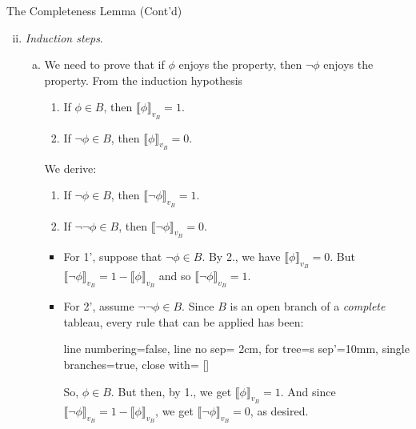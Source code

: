 \begin{frame}{The Completeness Lemma (Cont'd)}

\begin{enumerate}[(i)]
	
	\setcounter{enumi}{1}
	
	\item \emph{Induction steps}.
	
	\begin{enumerate}[(a)]
		
			\item We need to prove that if $\phi$ enjoys the property, then $\neg \phi$ enjoys the property. From the induction hypothesis
		
				\begin{enumerate}[1.]
	
					\item If $\phi\in B$, then $\llbracket\phi\rrbracket_{v_B}=1$. 
	
					\item If $\neg \phi\in B$, then $\llbracket\phi\rrbracket_{v_B}=0$.
	
				\end{enumerate}
	We derive:
		\begin{enumerate}[1'.]
	
		\item If $\neg\phi\in B$, then $\llbracket\neg\phi\rrbracket_{v_B}=1$.
			\item If $\neg\neg \phi\in B$, then $\llbracket\neg\phi\rrbracket_{v_B}=0$.	
		\end{enumerate}
		
		\begin{itemize}
	
		\item For 1', suppose that $\neg \phi\in B$. By 2., we have $\llbracket\phi\rrbracket_{v_B}=0$. But $\llbracket\neg\phi\rrbracket_{v_B}=1-\llbracket\phi\rrbracket_{v_B}$ and so $\llbracket\neg\phi\rrbracket_{v_B}=1$.
		
		\item For 2', assume $\neg\neg \phi\in B$. Since $B$ is an open branch of a \emph{complete} tableau, every rule that can be applied has been:
		\begin{center}{\small
					\begin{prooftree}
					{
					line numbering=false,
					line no sep= 2cm,
					for tree={s sep'=10mm},
					single branches=true,
					close with=\xmark
					}
					[\neg\neg\phi [\phi ] ]
					\end{prooftree}}
			\end{center} 
		So, $\phi\in B$. But then, by 1., we get $\llbracket\phi\rrbracket_{v_B}=1$. And since $\llbracket\neg\phi\rrbracket_{v_B}=1-\llbracket\phi\rrbracket_{v_B}$, we get $\llbracket\neg\phi\rrbracket_{v_B}=0$, as desired.
		
	\end{itemize}
	
	\end{enumerate}
			
	\end{enumerate}

\end{frame}


